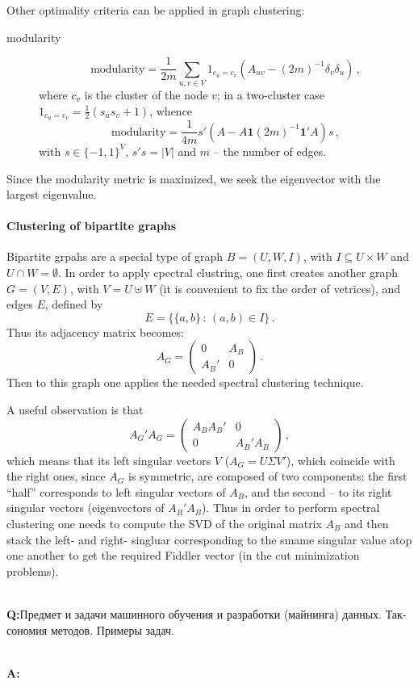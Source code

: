 \documentclass[a4paper]{article}
\newcommand{\one}{\mathbf{1}}
\newcommand{\rus}[1]{\foreignlanguage{russian}{#1}}
\begin{document}
Other optimality criteria can be applied in graph clustering: \begin{description}
    \item[modularity]
    $$ \text{modularity} =
        \frac{1}{2m} \sum_{u,v\in V} 1_{c_u=c_v}
            (A_{uv} - (2m)^{-1} \delta_v \delta_u)\,,$$
    where $c_v$ is the cluster of the node $v$; in a two-cluster case $1_{c_u=c_v}
    = \frac{1}{2}(s_u s_v + 1)$, whence
    $$ \text{modularity} = \frac{1}{4m} s'(A - A \one (2m)^{-1} \one'A) s\,,$$
    with $s\in \{-1,1\}^V$, $s's = |V|$ and $m$ -- the number of edges.
\end{description}
Since the modularity metric is maximized, we seek the eigenvector with the largest eigenvalue.

\paragraph{Clustering of bipartite graphs} %
\label{par:clustering_of_bipartite_graphs}

Bipartite grpahs are a special type of graph $B=(U, W, I)$, with $I \subseteq U\times
W$ and $U\cap W = \emptyset$. In order to apply cpectral clustring, one first creates
another graph $G=(V, E)$, with $V=U\uplus W$ (it is convenient to fix the order of
vetrices), and edges $E$, defined by
$$ E = \{ \{a, b\}\,:\, (a,b) \in I \} \,. $$
Thus its adjacency matrix becomes:
$$ A_G = \begin{pmatrix} 0 & A_B \\ A_B' & 0 \end{pmatrix}\,. $$
Then to this graph one applies the needed spectral clustering technique.

A useful observation is that
$$ A_G'A_G = \begin{pmatrix} A_B A_B' & 0 \\ 0 & A_B' A_B \end{pmatrix}\,, $$
which means that its left singular vectors $V$ ($A_G = U\Sigma V'$), which coincide
with the right ones, since $A_G$ is symmetric, are composed of two components:
the first ``half'' corresponds to left singular vectors of $A_B$, and the second
-- to its right singular vectors (eigenvectors of $A_B' A_B$). Thus in order to
perform spectral clustering one needs to compute the SVD of the original matrix
$A_B$ and then stack the left- and right- singluar corresponding to the smame singular
value atop one another to get the required Fiddler vector (in the cut minimization
problems).


\hfill\\\textbf{Q:}\rus{Предмет и задачи машинного обучения и разработки (майнинга)
данных. Таксономия методов. Примеры задач.}

\hfill\\\textbf{A:}

\end{document}
